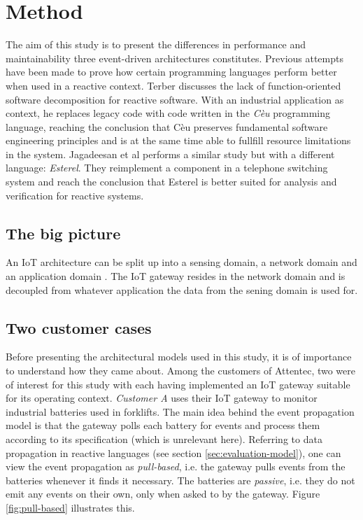 \chapter{Method}
\label{cha:method}

The aim of this study is to present the differences in performance and
maintainability three event-driven architectures constitutes. Previous attempts
have been made to prove how certain programming languages perform better when
used in a reactive context. Terber \cite{terber2017function} discusses the lack
of function-oriented software decomposition for reactive software. With an
industrial application as context, he replaces legacy code with code written in
the \textit{Cèu} programming language, reaching the conclusion that Cèu
preserves fundamental software engineering principles and is at the same time
able to fullfill resource limitations in the system. Jagadeesan et al
\cite{jagadeesan1996formal} performs a similar study but with a different
language: \textit{Esterel}. They reimplement a component in a telephone
switching system and reach the conclusion that Esterel is better suited for
analysis and verification for reactive systems.

\section{The big picture}

An IoT architecture can be split up into a sensing domain, a network domain and
an application domain \cite{chen2011brief}. The IoT gateway resides in the
network domain and is decoupled from whatever application the data from the
sening domain is used for.

\section{Two customer cases}
\label{sec:customer-cases}

Before presenting the architectural models used in this study, it is of
importance to understand how they came about. Among the customers of Attentec,
two were of interest for this study with each having implemented an IoT gateway
suitable for its operating context. \textit{Customer A} uses their IoT gateway
to monitor industrial batteries used in forklifts. The main idea behind the
event propagation model is that the gateway polls each battery for events and
process them according to its specification (which is unrelevant here).
Referring to data propagation in reactive languages (see section
\ref{sec:evaluation-model}), one can view the event propagation as
\textit{pull-based}, i.e. the gateway pulls events from the batteries whenever
it finds it necessary. The batteries are \textit{passive}, i.e. they do not
emit any events on their own, only when asked to by the gateway. Figure
\ref{fig:pull-based} illustrates this.

